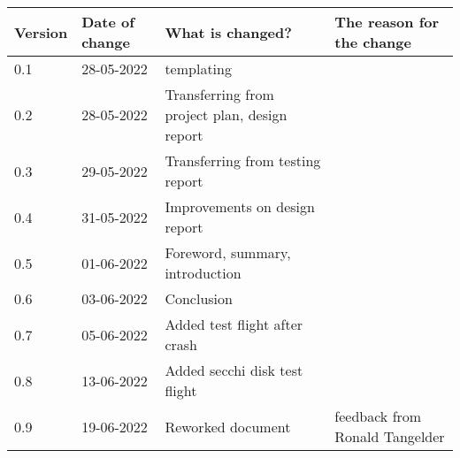 \begin{tabular}{ | l | l | l | l |}
    \hline
    \textbf{Version} & \textbf{Date of change} & \textbf{What is changed?} & \textbf{The reason for the change} \\ \hline
    0.1 & 28-05-2022 & templating & \\
    0.2 & 28-05-2022 & Transferring from project plan, design report & \\
    0.3 & 29-05-2022 & Transferring from testing report & \\
    0.4 & 31-05-2022 & Improvements on design report & \\
    0.5 & 01-06-2022 & Foreword, summary, introduction & \\
    0.6 & 03-06-2022 & Conclusion & \\
    0.7 & 05-06-2022 & Added test flight after crash & \\
    0.8 & 13-06-2022 & Added secchi disk test flight & \\
    0.9 & 19-06-2022 & Reworked document & feedback from Ronald Tangelder\\
    \hline
\end{tabular}
